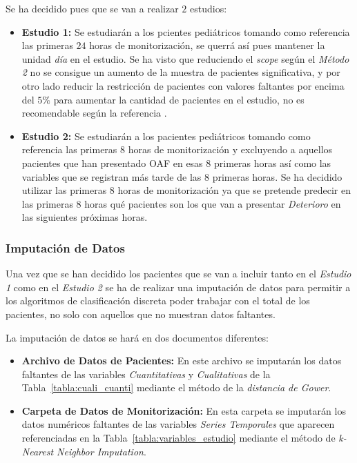 Se ha decidido pues que se van a realizar $2$ estudios:

\begin{itemize}
    \item \textbf{Estudio 1:} Se estudiarán a los pcientes pediátricos tomando como referencia las primeras $24$ horas de monitorización, se querrá así pues mantener la unidad \textit{día} en el estudio. Se ha visto que reduciendo el \textit{scope} según el \textit{Método 2} no se consigue un aumento de la muestra de pacientes significativa, y por otro lado reducir la restricción de pacientes con valores faltantes por encima del $5\%$ para aumentar la cantidad de pacientes en el estudio, no es recomendable según la referencia \cite{Scheffer2002}.
    \item \textbf{Estudio 2:} Se estudiarán a los pacientes pediátricos tomando como referencia las primeras $8$ horas de monitorización y excluyendo a aquellos pacientes que han presentado OAF en esas 8 primeras horas así como las variables que se registran más tarde de las $8$ primeras horas. Se ha decidido utilizar las primeras $8$ horas de monitorización ya que se pretende predecir en las primeras $8$ horas qué pacientes son los que van a presentar \textit{Deterioro} en las siguientes próximas horas.
\end{itemize}


\subsubsection{Imputación de Datos}\label{sec:imputacion-de-datos}

Una vez que se han decidido los pacientes que se van a incluir tanto en el \textit{Estudio 1} como en el \textit{Estudio 2} se ha de realizar una imputación de datos para permitir a los algoritmos de clasificación discreta poder trabajar con el total de los pacientes, no solo con aquellos que no muestran datos faltantes. 

La imputación de datos se hará en dos documentos diferentes:
\begin{itemize}
    \item \textbf{Archivo de Datos de Pacientes:} En este archivo se imputarán los datos faltantes de las variables \textit{Cuantitativas} y \textit{Cualitativas} de la Tabla~\ref{tabla:cuali_cuanti} mediante el método de la \textit{distancia de Gower}.
    \item \textbf{Carpeta de Datos de Monitorización:} En esta carpeta se imputarán los datos numéricos faltantes de las variables \textit{Series Temporales} que aparecen referenciadas en la Tabla~\ref{tabla:variables_estudio} mediante el método de \textit{k-Nearest Neighbor Imputation}.
\end{itemize}


